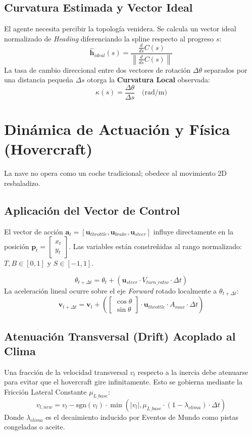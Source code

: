 \documentclass[a4paper,11pt]{article}
\begin{document}
\subsection{Curvatura Estimada y Vector Ideal}
El agente necesita percibir la topología venidera. Se calcula un vector ideal normalizado de \textit{Heading} diferenciando la spline respecto al progreso $s$:
$$ \hat{\mathbf{h}}_{ideal}(s) = \frac{\frac{d}{ds} C(s)}{\left\| \frac{d}{ds} C(s) \right\|} $$
La tasa de cambio direccional entre dos vectores de rotación $\Delta \theta$ separados por una distancia pequeña $\Delta s$ otorga la \textbf{Curvatura Local} observada:
$$ \kappa(s) = \frac{\Delta \theta}{\Delta s} \quad \text{(rad/m)} $$

\section{Dinámica de Actuación y Física (Hovercraft)}
La nave no opera como un coche tradicional; obedece al movimiento 2D resbaladizo.

\subsection{Aplicación del Vector de Control}
El vector de acción $\mathbf{a}_t = [\mathbf{u}_{throttle}, \mathbf{u}_{brake}, \mathbf{u}_{steer}]$ influye directamente en la posición $\mathbf{p}_t = \begin{bmatrix} x_t \\ y_t \end{bmatrix}$. Las variables están constreñidas al rango normalizado: $T, B \in [0, 1]$ y $S \in [-1, 1]$.

$$ \theta_{t+\Delta t} = \theta_t + (\mathbf{u}_{steer} \cdot V_{turn\_ratio} \cdot \Delta t) $$
La aceleración lineal ocurre sobre el eje \textit{Forward} rotado localmente a $\theta_{t+\Delta t}$:
$$ \mathbf{v}_{t+\Delta t} = \mathbf{v}_t + \left( \begin{bmatrix} \cos\theta \\ \sin\theta \end{bmatrix} \cdot \mathbf{u}_{throttle} \cdot A_{max} \cdot \Delta t \right) $$

\subsection{Atenuación Transversal (Drift) Acoplado al Clima}
Una fracción de la velocidad transversal $v_{l}$ respecto a la inercia debe atenuarse para evitar que el hovercraft gire infinitamente. Esto se gobierna mediante la Fricción Lateral Constante $\mu_{L\_base}$:
$$ v_{l, new} = v_l - \text{sgn}(v_l) \cdot \min(|v_l|, \mu_{L\_base} \cdot (1 - \lambda_{clima}) \cdot \Delta t) $$
Donde $\lambda_{clima}$ es el decaimiento inducido por Eventos de Mundo como pistas congeladas o aceite.
\end{document}
